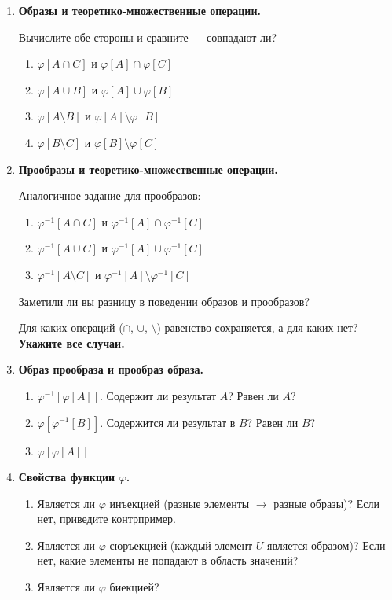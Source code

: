 \documentclass[11pt, a4paper]{extarticle}
\newcommand{\ph}{\varphi}
\begin{document}
\begin{exercise}
\begin{enumerate}
\item \textbf{Образы и теоретико-множественные операции.}

Вычислите обе стороны и сравните --- совпадают ли?
\begin{enumerate}[label=(\roman*), start=15]
    \item $\ph[A \cap C]$ и $\ph[A] \cap \ph[C]$
    \item $\ph[A \cup B]$ и $\ph[A] \cup \ph[B]$
    \item $\ph[A \setminus B]$ и $\ph[A] \setminus \ph[B]$
    \item $\ph[B \setminus C]$ и $\ph[B] \setminus \ph[C]$
\end{enumerate}

\item \textbf{Прообразы и теоретико-множественные операции.}

Аналогичное задание для прообразов:
\begin{enumerate}[label=(\roman*), start=19]
    \item $\ph^{-1}[A \cap C]$ и $\ph^{-1}[A] \cap \ph^{-1}[C]$
    \item $\ph^{-1}[A \cup C]$ и $\ph^{-1}[A] \cup \ph^{-1}[C]$
    \item $\ph^{-1}[A \setminus C]$ и $\ph^{-1}[A] \setminus \ph^{-1}[C]$
\end{enumerate}
Заметили ли вы разницу в поведении образов и прообразов? 

Для каких операций ($\cap$, $\cup$, $\setminus$) равенство сохраняется, а для каких нет? \textbf{Укажите все случаи.}

\item \textbf{Образ прообраза и прообраз образа.}
\begin{enumerate}[label=(\roman*), start=22]
    \item $\ph^{-1}[\ph[A]]$. Содержит ли результат $A$? Равен ли $A$?
    \item $\ph[\ph^{-1}[B]]$. Содержится ли результат в $B$? Равен ли $B$?
    \item $\ph[\ph[A]]$
\end{enumerate}

\item \textbf{Свойства функции $\ph$.}
\begin{enumerate}[label=(\roman*), start=25]
    \item Является ли $\ph$ инъекцией (разные элементы $\to$ разные образы)? Если нет, приведите контрпример.
    \item Является ли $\ph$ сюръекцией (каждый элемент $U$ является образом)? Если нет, какие элементы не попадают в область значений?
    \item Является ли $\ph$ биекцией?
\end{enumerate}


\end{enumerate}
\end{exercise}
\end{document}
